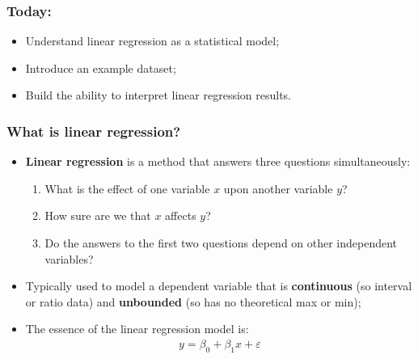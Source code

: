 \documentclass[aspectratio=169]{beamer}
\theoremstyle{principle}
\begin{document}
\begin{frame}
\frametitle{Today:}

\begin{itemize}
\item Understand linear regression as a statistical model;
\bigskip
\bigskip
\bigskip

\item Introduce an example dataset;
\bigskip
\bigskip
\bigskip

\item Build the ability to interpret linear regression results.

\end{itemize}

\end{frame}

\begin{frame}
\frametitle{What is linear regression?}

\begin{itemize}
\item \textbf{Linear regression} is a method that answers three questions simultaneously:
\begin{enumerate}
\item What is the effect of one variable $x$ upon another variable $y$?
\item How sure are we that $x$ affects $y$?
\item Do the answers to the first two questions depend on other independent variables?
\end{enumerate}
\bigskip
\bigskip

\item Typically used to model a dependent variable that is \textbf{continuous} (so interval or ratio data) and \textbf{unbounded} (so has no theoretical max or min);
\bigskip
\bigskip

\item The essence of the linear regression model is:
\begin{align*}
y = \beta_0 + \beta_1x + \varepsilon
\end{align*}

\end{itemize}

\end{frame}
\end{document}
